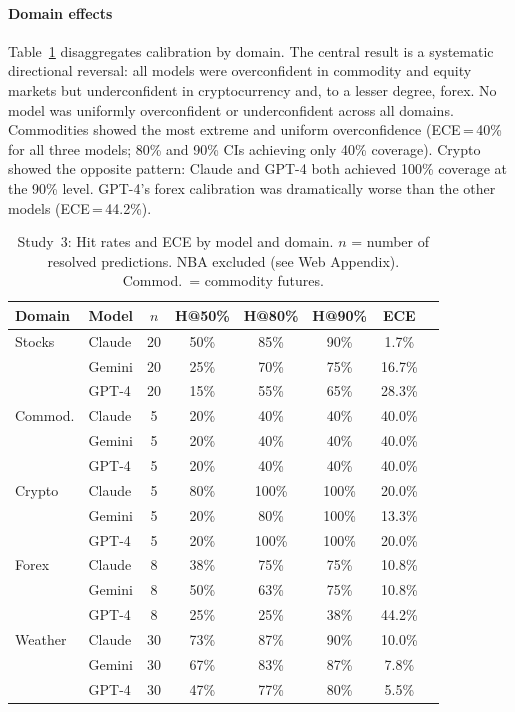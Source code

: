 \paragraph{Domain effects} Table~\ref{tab:study3-domain} disaggregates
calibration by domain. The central result is a systematic directional
reversal: all models were overconfident in commodity and equity markets but
underconfident in cryptocurrency and, to a lesser degree, forex. No model
was uniformly overconfident or underconfident across all domains.
Commodities showed the most extreme and uniform overconfidence (ECE\,=\,40\%
for all three models; 80\% and 90\% CIs achieving only 40\% coverage).
Crypto showed the opposite pattern: Claude and GPT-4 both achieved 100\%
coverage at the 90\% level. GPT-4's forex calibration was dramatically worse
than the other models (ECE\,=\,44.2\%).

\begin{table}[ht]
  \centering
  \caption{Study~3: Hit rates and ECE by model and domain. $n$ = number
    of resolved predictions. NBA excluded (see Web Appendix).
    Commod.\ = commodity futures.}
  \label{tab:study3-domain}
  \begin{tabular}{llcccccc}
    \toprule
    Domain  & Model  & $n$ & H@50\% & H@80\% & H@90\% & ECE    \\
    \midrule
    Stocks  & Claude & 20  & 50\%  & 85\%  & 90\%  &  1.7\% \\
            & Gemini & 20  & 25\%  & 70\%  & 75\%  & 16.7\% \\
            & GPT-4  & 20  & 15\%  & 55\%  & 65\%  & 28.3\% \\
    \addlinespace
    Commod. & Claude &  5  & 20\%  & 40\%  & 40\%  & 40.0\% \\
            & Gemini &  5  & 20\%  & 40\%  & 40\%  & 40.0\% \\
            & GPT-4  &  5  & 20\%  & 40\%  & 40\%  & 40.0\% \\
    \addlinespace
    Crypto  & Claude &  5  & 80\%  & 100\% & 100\% & 20.0\% \\
            & Gemini &  5  & 20\%  & 80\%  & 100\% & 13.3\% \\
            & GPT-4  &  5  & 20\%  & 100\% & 100\% & 20.0\% \\
    \addlinespace
    Forex   & Claude &  8  & 38\%  &  75\% &  75\% & 10.8\% \\
            & Gemini &  8  & 50\%  &  63\% &  75\% & 10.8\% \\
            & GPT-4  &  8  & 25\%  &  25\% &  38\% & 44.2\% \\
    \addlinespace
    Weather & Claude & 30  & 73\%  &  87\% &  90\% & 10.0\% \\
            & Gemini & 30  & 67\%  &  83\% &  87\% &  7.8\% \\
            & GPT-4  & 30  & 47\%  &  77\% &  80\% &  5.5\% \\
    \bottomrule
  \end{tabular}
\end{table}

